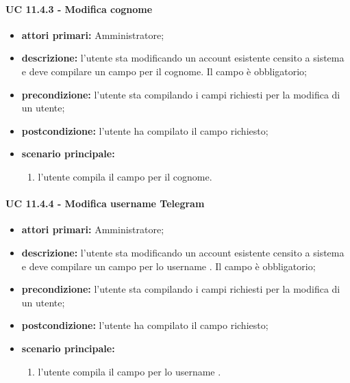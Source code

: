 				\paragraph{UC 11.4.3 - Modifica cognome}
				\begin{itemize}
					\item \textbf{attori primari:} Amministratore;
					\item \textbf{descrizione:} l'utente sta modificando un account esistente censito a sistema e deve compilare un campo per il cognome. Il campo è obbligatorio;
					\item \textbf{precondizione:} l'utente sta compilando i campi richiesti per la modifica di un utente;
					\item \textbf{postcondizione:} l'utente ha compilato il campo richiesto;
					\item \textbf{scenario principale:}
					\begin{enumerate}
						\item{l'utente compila il campo per il cognome.}
					\end{enumerate}	
				\end{itemize}

				\paragraph{UC 11.4.4 - Modifica username Telegram}
				\begin{itemize}
					\item \textbf{attori primari:} Amministratore;
					\item \textbf{descrizione:} l'utente sta modificando un account esistente censito a sistema e deve compilare un campo per lo username . Il campo è obbligatorio;
					\item \textbf{precondizione:} l'utente sta compilando i campi richiesti per la modifica di un utente;
					\item \textbf{postcondizione:} l'utente ha compilato il campo richiesto;
					\item \textbf{scenario principale:}
					\begin{enumerate}
						\item{l'utente compila il campo per lo username .}
					\end{enumerate}	
				\end{itemize}

